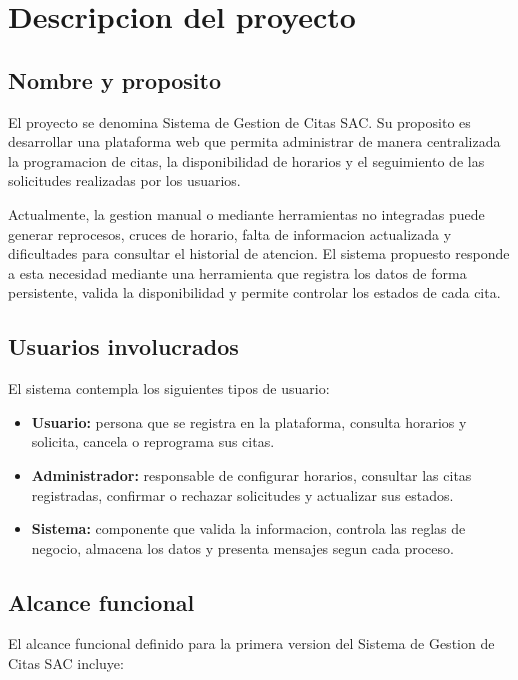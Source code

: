 \documentclass[12pt,letterpaper]{article}
\newcommand{\nombreProyecto}{Sistema de Gestion de Citas SAC}
\begin{document}
\section{Descripcion del proyecto}

\subsection{Nombre y proposito}

El proyecto se denomina \nombreProyecto. Su proposito es desarrollar una plataforma web que permita administrar de manera centralizada la programacion de citas, la disponibilidad de horarios y el seguimiento de las solicitudes realizadas por los usuarios.

Actualmente, la gestion manual o mediante herramientas no integradas puede generar reprocesos, cruces de horario, falta de informacion actualizada y dificultades para consultar el historial de atencion. El sistema propuesto responde a esta necesidad mediante una herramienta que registra los datos de forma persistente, valida la disponibilidad y permite controlar los estados de cada cita.

\subsection{Usuarios involucrados}

El sistema contempla los siguientes tipos de usuario:

\begin{itemize}[leftmargin=1.2cm]
    \item \textbf{Usuario:} persona que se registra en la plataforma, consulta horarios y solicita, cancela o reprograma sus citas.
    \item \textbf{Administrador:} responsable de configurar horarios, consultar las citas registradas, confirmar o rechazar solicitudes y actualizar sus estados.
    \item \textbf{Sistema:} componente que valida la informacion, controla las reglas de negocio, almacena los datos y presenta mensajes segun cada proceso.
\end{itemize}

\subsection{Alcance funcional}

El alcance funcional definido para la primera version del Sistema de Gestion de Citas SAC incluye:
\end{document}
